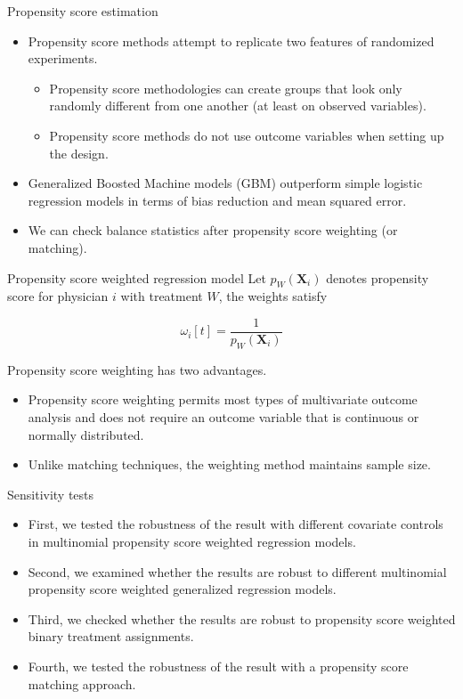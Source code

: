 \documentclass[10pt, compress]{beamer}
\begin{document}
\begin{frame}{Propensity score estimation}
      \begin{itemize}
        \item  Propensity score methods attempt to replicate two features of randomized experiments.
        \begin{itemize}
			\item Propensity score methodologies can create groups that look only randomly different from one another (at least on observed variables). 
            \item Propensity score methods do not use outcome variables when setting up the design.
		\end{itemize}
        \item  Generalized Boosted Machine models (GBM) outperform simple logistic regression models in terms of bias reduction and mean squared error.
        \item We can check balance statistics after propensity score weighting (or matching).
      \end{itemize}

\end{frame}

\begin{frame}{Propensity score weighted regression model}
Let  $p_W(\mathbf{X}_i)$ denotes propensity score for physician $i$ with treatment $W$, the weights satisfy

\begin{equation*}
\omega_i[t]=\frac{1}{p_W(\mathbf{X}_i)}
\end{equation*} 

Propensity score weighting has two advantages.
      \begin{itemize}
        \item Propensity score weighting permits most types of multivariate outcome analysis and does not require an outcome variable that is continuous or normally distributed. 
        \item Unlike matching techniques, the weighting method maintains sample size.
      \end{itemize}

\end{frame}

\begin{frame}{Sensitivity tests}

      \begin{itemize}
        \item First, we tested the robustness of the result with different covariate controls in multinomial propensity score weighted regression models.
        \item Second, we examined whether the results are robust to different multinomial propensity score weighted generalized regression models.
        \item Third, we checked whether the results are robust to propensity score weighted binary treatment assignments.
        \item Fourth, we tested the robustness of the result with a propensity score matching approach.
      \end{itemize}

\end{frame}
\end{document}

